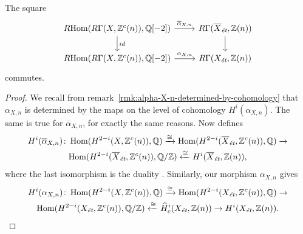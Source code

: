 \documentclass{article}
\numberwithin{equation}{section}
\begin{document}
\begin{lemma}
  The square
  \[ \begin{tikzcd}
      \RHom (R\Gamma (X, \ZZ^c (n)), \QQ [-2]) \ar{r}{\overline{\alpha}_{X,n}}\ar{d}{id} & R\Gamma (\overline{X}_\et, \ZZ(n))\ar{d} \\
      \RHom (R\Gamma (X, \ZZ^c (n)), \QQ [-2]) \ar{r}{\alpha_{X,n}} & R\Gamma (X_\et, \ZZ(n))
    \end{tikzcd} \]
  commutes.

  \begin{proof}
    We recall from remark~\ref{rmk:alpha-X-n-determined-by-cohomology} that
    $\alpha_{X,n}$ is determined by the maps on the level of cohomology
    $H^i (\alpha_{X,n})$. The same is true for $\overline{\alpha}_{X,n}$, for
    exactly the same reasons. Now \cite[Theorem~3.5]{Flach-Morin-2018} defines
    \begin{multline*}
      H^i (\overline{\alpha}_{X,n})\colon
      \Hom (H^{2-i} (X, \ZZ^c (n)), \QQ) \xrightarrow{\cong}
      \Hom (H^{2-i} (\overline{X}_\et, \ZZ^c (n)), \QQ) \to \\
      \Hom (H^{2-i} (\overline{X}_\et, \ZZ^c (n)), \QQ/\ZZ) \xleftarrow{\cong}
      H^i (\overline{X}_\et, \ZZ (n)),
    \end{multline*}
    where the last isomorphism is the duality
    \cite[Corollary~6.26]{Flach-Morin-2018}. Similarly, our morphism
    $\alpha_{X,n}$ gives
    \begin{multline*}
      H^i (\alpha_{X,n})\colon
      \Hom (H^{2-i} (X, \ZZ^c (n)), \QQ) \xrightarrow{\cong}
      \Hom (H^{2-i} (X_\et, \ZZ^c (n)), \QQ) \to \\
      \Hom (H^{2-i} (X_\et, \ZZ^c (n)), \QQ/\ZZ) \xleftarrow{\cong}
      \widehat{H}^i_c (X_\et, \ZZ (n)) \to
      H^i (X_\et, \ZZ (n)).
    \end{multline*}


\end{proof}
\end{lemma}
\end{document}
